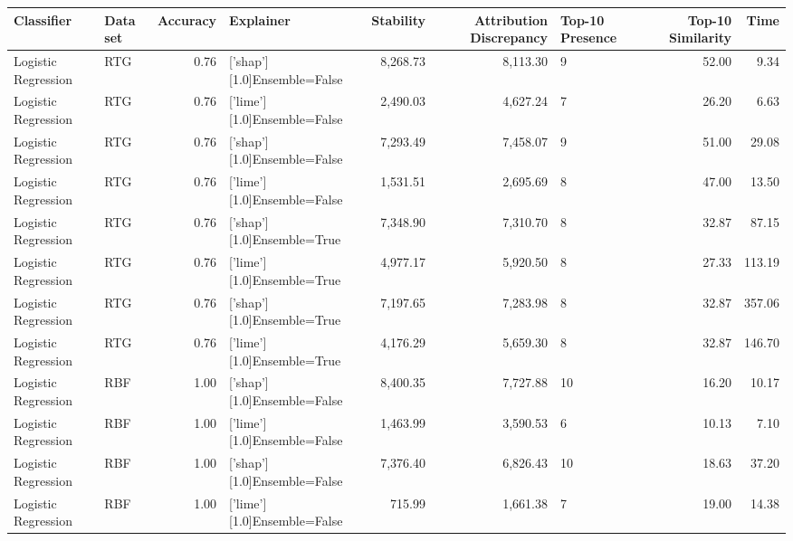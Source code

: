 \begin{tabular}{llrlrrlrr}
\toprule
         Classifier & Data set &  Accuracy &                   Explainer &  Stability &  Attribution Discrepancy & Top-10 Presence &  Top-10 Similarity &   Time \\
\midrule
Logistic Regression &      RTG &      0.76 & ['shap'][1.0]Ensemble=False &   8,268.73 &                 8,113.30 &               9 &              52.00 &   9.34 \\
Logistic Regression &      RTG &      0.76 & ['lime'][1.0]Ensemble=False &   2,490.03 &                 4,627.24 &               7 &              26.20 &   6.63 \\
Logistic Regression &      RTG &      0.76 & ['shap'][1.0]Ensemble=False &   7,293.49 &                 7,458.07 &               9 &              51.00 &  29.08 \\
Logistic Regression &      RTG &      0.76 & ['lime'][1.0]Ensemble=False &   1,531.51 &                 2,695.69 &               8 &              47.00 &  13.50 \\
Logistic Regression &      RTG &      0.76 &  ['shap'][1.0]Ensemble=True &   7,348.90 &                 7,310.70 &               8 &              32.87 &  87.15 \\
Logistic Regression &      RTG &      0.76 &  ['lime'][1.0]Ensemble=True &   4,977.17 &                 5,920.50 &               8 &              27.33 & 113.19 \\
Logistic Regression &      RTG &      0.76 &  ['shap'][1.0]Ensemble=True &   7,197.65 &                 7,283.98 &               8 &              32.87 & 357.06 \\
Logistic Regression &      RTG &      0.76 &  ['lime'][1.0]Ensemble=True &   4,176.29 &                 5,659.30 &               8 &              32.87 & 146.70 \\
Logistic Regression &      RBF &      1.00 & ['shap'][1.0]Ensemble=False &   8,400.35 &                 7,727.88 &              10 &              16.20 &  10.17 \\
Logistic Regression &      RBF &      1.00 & ['lime'][1.0]Ensemble=False &   1,463.99 &                 3,590.53 &               6 &              10.13 &   7.10 \\
Logistic Regression &      RBF &      1.00 & ['shap'][1.0]Ensemble=False &   7,376.40 &                 6,826.43 &              10 &              18.63 &  37.20 \\
Logistic Regression &      RBF &      1.00 & ['lime'][1.0]Ensemble=False &     715.99 &                 1,661.38 &               7 &              19.00 &  14.38 \\

\end{tabular}
